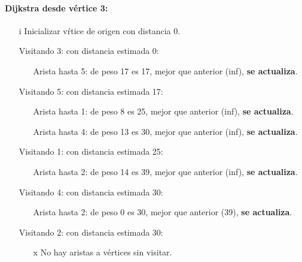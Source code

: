 \documentclass[../tp2_grupo404.tex]{subfiles}
\begin{document}
\paragraph{Dijkstra desde v\'ertice 3:}\par
\begin{enumerate}
\item[i] Inicializar v\'rtice de origen con distancia 0.
 \item[Visitando 3:] con distancia estimada 0:
\begin{enumerate}
   \item[Arista hasta 5:] de peso 17 es 17, mejor que anterior (inf), \textbf{se actualiza}.
\end{enumerate}

 \item[Visitando 5:] con distancia estimada 17:
\begin{enumerate}
   \item[Arista hasta 1:] de peso 8 es 25, mejor que anterior (inf), \textbf{se actualiza}.
   \item[Arista hasta 4:] de peso 13 es 30, mejor que anterior (inf), \textbf{se actualiza}.
\end{enumerate}

 \item[Visitando 1:] con distancia estimada 25:
\begin{enumerate}
   \item[Arista hasta 2:] de peso 14 es 39, mejor que anterior (inf), \textbf{se actualiza}.
\end{enumerate}

 \item[Visitando 4:] con distancia estimada 30:
\begin{enumerate}
   \item[Arista hasta 2:] de peso 0 es 30, mejor que anterior (39), \textbf{se actualiza}.
\end{enumerate}

 \item[Visitando 2:] con distancia estimada 30:
\begin{enumerate}
   \item[x] No hay aristas a v\'ertices sin visitar.
\end{enumerate}

\end{enumerate}
\end{document}
